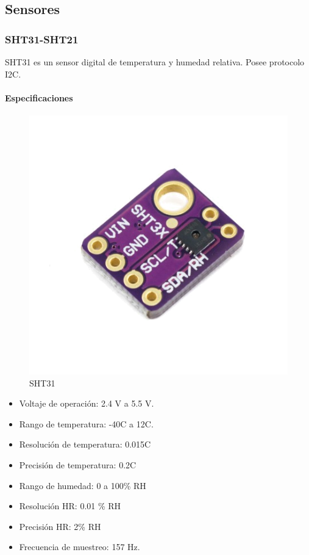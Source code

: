 
\subsection{Sensores}
	\subsubsection{SHT31-SHT21}
	SHT31 es un sensor digital de temperatura y humedad relativa. Posee protocolo I2C.
	\paragraph*{Especificaciones}

	

	\begin{figure}[htb]
		\centering
		\includegraphics[scale=0.35]{SHT31.png}
		\caption{SHT31}
		\label{fig:SHT31}
	\end{figure}
		\begin{itemize}
			\item   Voltaje de operación: 2.4 V a 5.5 V.
			\item	Rango de temperatura: -40\grad C a 12\grad C.
			\item   Resolución de temperatura: 0.015\grad C
			\item	Precisión de temperatura: 0.2\grad C 
			\item	Rango de humedad: 0 a 100\% RH
			\item   Resolución HR: 0.01 \% RH
			\item   Precisión HR: 2\% RH
			\item Frecuencia de muestreo: 157 Hz.
		\end{itemize}

